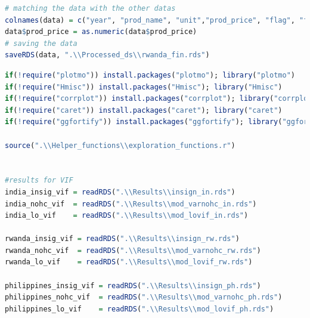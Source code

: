 \documentclass[11pt]{article}
\begin{document}
\begin{lstlisting}[language= R]
# matching the data with the other datas 
colnames(data) = c("year", "prod_name", "unit","prod_price", "flag", "flag.description", "tas_q1", "tas_q2", "tas_q3", "tas_q4", "pr_q1", "pr_q2", "pr_q3", "pr_q4", "avg_p_barrel","population_unit", "population", "prod_amount", "gni_pc", "exchange_rate", "gdp", "cp_inflation", "agri_gdp", "exp_veg", "exp_cer", "imp_veg", "imp_cer", "daily_caloric_supply")
data$prod_price = as.numeric(data$prod_price)
# saving the data
saveRDS(data, ".\\Processed_ds\\rwanda_fin.rds")
\end{lstlisting}



\begin{lstlisting}[language= R]
if(!require("plotmo")) install.packages("plotmo"); library("plotmo")
if(!require("Hmisc")) install.packages("Hmisc"); library("Hmisc")
if(!require("corrplot")) install.packages("corrplot"); library("corrplot")
if(!require("caret")) install.packages("caret"); library("caret")
if(!require("ggfortify")) install.packages("ggfortify"); library("ggfortify")

source(".\\Helper_functions\\exploration_functions.r")


#results for VIF
india_insig_vif = readRDS(".\\Results\\insign_in.rds")
india_nohc_vif  = readRDS(".\\Results\\mod_varnohc_in.rds")
india_lo_vif    = readRDS(".\\Results\\mod_lovif_in.rds")

rwanda_insig_vif = readRDS(".\\Results\\insign_rw.rds")
rwanda_nohc_vif  = readRDS(".\\Results\\mod_varnohc_rw.rds")
rwanda_lo_vif    = readRDS(".\\Results\\mod_lovif_rw.rds")

philippines_insig_vif = readRDS(".\\Results\\insign_ph.rds")
philippines_nohc_vif  = readRDS(".\\Results\\mod_varnohc_ph.rds")
philippines_lo_vif    = readRDS(".\\Results\\mod_lovif_ph.rds")



\end{lstlisting}
\end{document}
